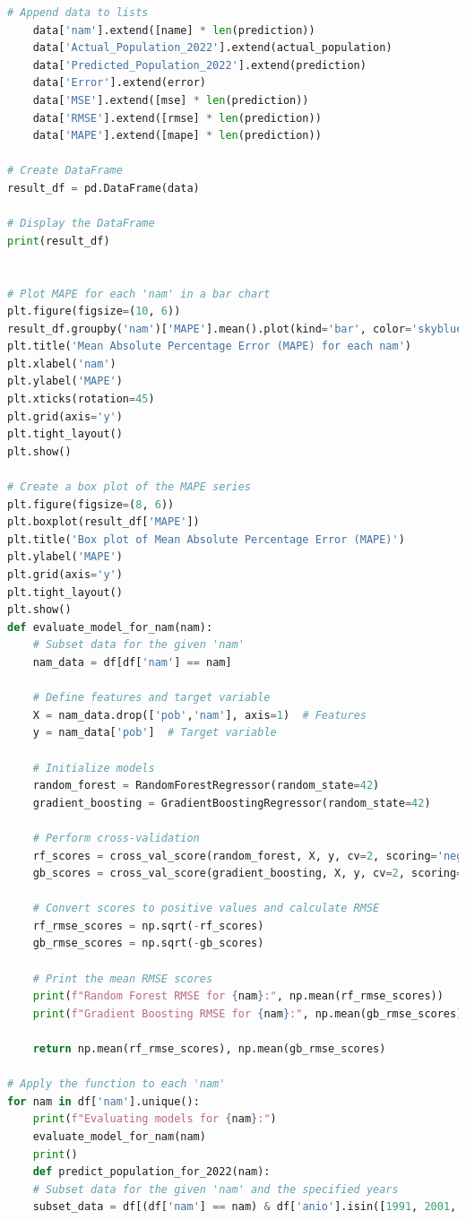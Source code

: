 \documentclass{article}
\theoremstyle{mytheoremstyle}
\theoremstyle{mytheoremstyle}
\theoremstyle{myproblemstyle}
\begin{document}
\begin{lstlisting}[language=Python, caption=Random Forest.ipynb,label={lst:RANDOMT.ipynb}]
    # Append data to lists
    data['nam'].extend([name] * len(prediction))
    data['Actual_Population_2022'].extend(actual_population)
    data['Predicted_Population_2022'].extend(prediction)
    data['Error'].extend(error)
    data['MSE'].extend([mse] * len(prediction))
    data['RMSE'].extend([rmse] * len(prediction))
    data['MAPE'].extend([mape] * len(prediction))

# Create DataFrame
result_df = pd.DataFrame(data)

# Display the DataFrame
print(result_df)


# Plot MAPE for each 'nam' in a bar chart
plt.figure(figsize=(10, 6))
result_df.groupby('nam')['MAPE'].mean().plot(kind='bar', color='skyblue')
plt.title('Mean Absolute Percentage Error (MAPE) for each nam')
plt.xlabel('nam')
plt.ylabel('MAPE')
plt.xticks(rotation=45)
plt.grid(axis='y')
plt.tight_layout()
plt.show()

# Create a box plot of the MAPE series
plt.figure(figsize=(8, 6))
plt.boxplot(result_df['MAPE'])
plt.title('Box plot of Mean Absolute Percentage Error (MAPE)')
plt.ylabel('MAPE')
plt.grid(axis='y')
plt.tight_layout()
plt.show()
def evaluate_model_for_nam(nam):
    # Subset data for the given 'nam'
    nam_data = df[df['nam'] == nam]
    
    # Define features and target variable
    X = nam_data.drop(['pob','nam'], axis=1)  # Features
    y = nam_data['pob']  # Target variable
    
    # Initialize models
    random_forest = RandomForestRegressor(random_state=42)
    gradient_boosting = GradientBoostingRegressor(random_state=42)
    
    # Perform cross-validation
    rf_scores = cross_val_score(random_forest, X, y, cv=2, scoring='neg_mean_squared_error')
    gb_scores = cross_val_score(gradient_boosting, X, y, cv=2, scoring='neg_mean_squared_error')
    
    # Convert scores to positive values and calculate RMSE
    rf_rmse_scores = np.sqrt(-rf_scores)
    gb_rmse_scores = np.sqrt(-gb_scores)
    
    # Print the mean RMSE scores
    print(f"Random Forest RMSE for {nam}:", np.mean(rf_rmse_scores))
    print(f"Gradient Boosting RMSE for {nam}:", np.mean(gb_rmse_scores))
    
    return np.mean(rf_rmse_scores), np.mean(gb_rmse_scores)

# Apply the function to each 'nam'
for nam in df['nam'].unique():
    print(f"Evaluating models for {nam}:")
    evaluate_model_for_nam(nam)
    print()
    def predict_population_for_2022(nam):
    # Subset data for the given 'nam' and the specified years
    subset_data = df[(df['nam'] == nam) & df['anio'].isin([1991, 2001, 2010])]
    

\end{lstlisting}
\end{document}
